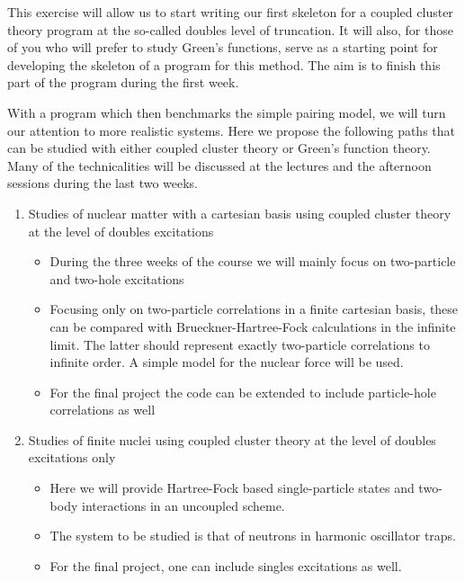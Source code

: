 \documentclass[%
twoside,                 %
final,                   %
10pt]{article}
\begin{document}
This exercise will allow us to start writing our first skeleton for a coupled cluster theory program at the so-called doubles level of truncation. It will also, for those of you who will prefer  to study Green's functions, serve as a 
starting point for developing the skeleton of a program for this method. The aim is to finish this part of the program during the first week.

With a program which then benchmarks the simple pairing model, we will turn our attention to more realistic systems.
Here we propose the following  paths that can be studied with either coupled cluster theory or Green's function theory. Many of the technicalities will be discussed at the lectures and the afternoon sessions during the last two weeks.

\begin{enumerate}
\item Studies of nuclear matter with a cartesian basis using coupled cluster theory at the level of doubles excitations
\begin{itemize}

  \item During the three weeks of the course we will mainly focus on two-particle and two-hole excitations 

  \item Focusing only on two-particle correlations in a finite cartesian basis, these can be compared with Brueckner-Hartree-Fock calculations in the infinite limit. The latter should represent exactly two-particle correlations to infinite order. A simple model for the nuclear force will be used.

  \item For the final project the code can be extended to include particle-hole correlations as well

\end{itemize}

\noindent
\item Studies of finite nuclei using coupled cluster theory at the level of doubles excitations only
\begin{itemize}

  \item Here we will provide Hartree-Fock based single-particle states and two-body interactions in an uncoupled scheme.

  \item The system to be studied is that of neutrons in harmonic oscillator traps. 

  \item For the final project, one can include singles excitations as well.


\end{itemize}
\end{enumerate}
\end{document}
